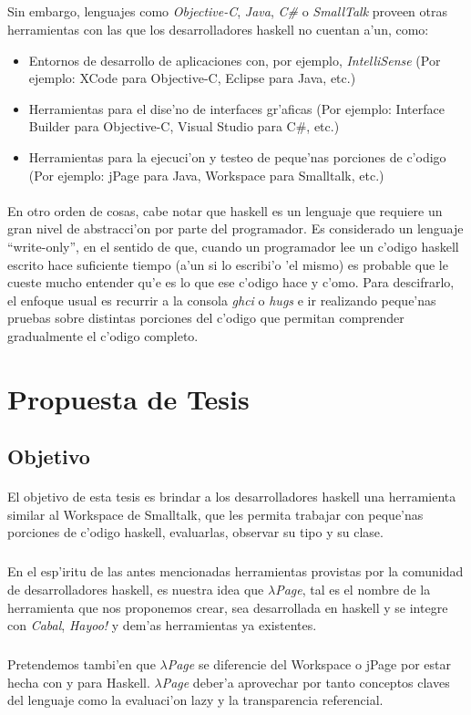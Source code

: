 \documentclass[a4paper]{article}
\begin{document}
\subparagraph{}Sin embargo, lenguajes como \textsl{Objective-C}, \textsl{Java}, \textsl{C\#} o \textsl{SmallTalk} proveen otras herramientas con las que los desarrolladores haskell no cuentan a'un, como:
\begin{itemize}
\item Entornos de desarrollo de aplicaciones con, por ejemplo, \textsl{IntelliSense} (Por ejemplo: XCode para Objective-C, Eclipse para Java, etc.)
\item Herramientas para el dise'no de interfaces gr'aficas (Por ejemplo: Interface Builder para Objective-C, Visual Studio para C\#, etc.)
\item Herramientas para la ejecuci'on y testeo de peque'nas porciones de c'odigo (Por ejemplo: jPage para Java, Workspace para Smalltalk, etc.)
\end{itemize}
\paragraph{}En otro orden de cosas, cabe notar que haskell es un lenguaje que requiere un gran nivel de abstracci'on por parte del programador.  Es considerado un lenguaje ``write-only'', en el sentido de que, cuando un programador lee un c'odigo haskell escrito hace suficiente tiempo (a'un si lo escribi'o 'el mismo) es probable que le cueste mucho entender qu'e es lo que ese c'odigo hace y c'omo.  Para descifrarlo, el enfoque usual es recurrir a la consola \textsl{ghci} o \textsl{hugs} e ir realizando peque'nas pruebas sobre distintas porciones del c'odigo que permitan comprender gradualmente el c'odigo completo.

\section{Propuesta de Tesis}
\subsection{Objetivo}
\paragraph{}El objetivo de esta tesis es brindar a los desarrolladores haskell una herramienta similar al Workspace de Smalltalk, que les permita trabajar con peque'nas porciones de c'odigo haskell, evaluarlas, observar su tipo y su clase.
\subparagraph{}En el esp'iritu de las antes mencionadas herramientas provistas por la comunidad de desarrolladores haskell, es nuestra idea que \textsl{$\lambda$Page}, tal es el nombre de la herramienta que nos proponemos crear, sea desarrollada en haskell y se integre con \textsl{Cabal}, \textsl{Hayoo!} y dem'as herramientas ya existentes.
\subparagraph{}Pretendemos tambi'en que \textsl{$\lambda$Page} se diferencie del Workspace o jPage por estar hecha con y para Haskell.  \textsl{$\lambda$Page} deber'a aprovechar por tanto conceptos claves del lenguaje como la evaluaci'on lazy y la transparencia referencial.
\end{document}
